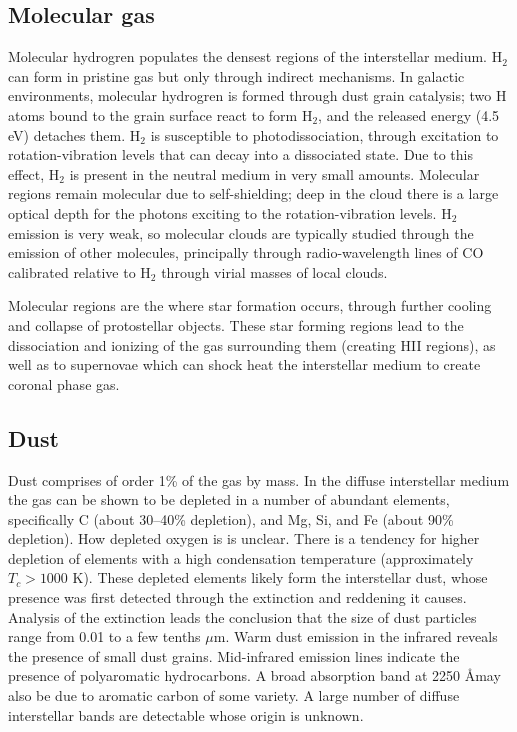 \subsection{Molecular gas}

Molecular hydrogren populates the densest regions of the interstellar
medium. H$_2$ can form in pristine gas but only through indirect
mechanisms. In galactic environments, molecular hydrogren is formed
through dust grain catalysis; two H atoms bound to the grain surface
react to form H$_2$, and the released energy (4.5 eV) detaches
them. H$_2$ is susceptible to photodissociation, through excitation to
rotation-vibration levels that can decay into a dissociated state. Due
to this effect, H$_2$ is present in the neutral medium in very small
amounts. Molecular regions remain molecular due to self-shielding;
deep in the cloud there is a large optical depth for the photons
exciting to the rotation-vibration levels. H$_2$ emission is very
weak, so molecular clouds are typically studied through the emission
of other molecules, principally through radio-wavelength lines of CO
calibrated relative to H$_2$ through virial masses of local clouds.

Molecular regions are the where star formation occurs, through further
cooling and collapse of protostellar objects. These star forming
regions lead to the dissociation and ionizing of the gas surrounding
them (creating HII regions), as well as to supernovae which can shock
heat the interstellar medium to create coronal phase gas.

\subsection{Dust}

Dust comprises of order 1\% of the gas by mass. In the diffuse
interstellar medium the gas can be shown to be depleted in a number of
abundant elements, specifically C (about 30--40\% depletion), and Mg,
Si, and Fe (about 90\% depletion). How depleted oxygen is is unclear.
There is a tendency for higher depletion of elements with a high
condensation temperature (approximately $T_c>1000$ K). These depleted
elements likely form the interstellar dust, whose presence was first
detected through the extinction and reddening it causes. Analysis of
the extinction leads the conclusion that the size of dust particles
range from 0.01 to a few tenths $\mu$m. Warm dust emission in the
infrared reveals the presence of small dust grains. Mid-infrared
emission lines indicate the presence of polyaromatic hydrocarbons. A
broad absorption band at 2250 \AA may also be due to aromatic carbon
of some variety. A large number of diffuse interstellar bands are
detectable whose origin is unknown.


